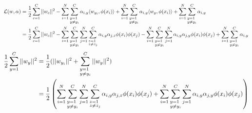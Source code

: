 \begin{align}
	\mathcal{L}(w,\alpha) &= 
	\frac{1}{2} \sum_{c=1}^C ||w_c||^2 
	 - \sum_{i=1}^N \sum_{\begin{subarray}{l} y=1 \\ y\neq y_i \end{subarray}}^C 
	   \alpha_{i,y} \langle w_{y_i}, \phi(x_i)\rangle 
	 + \sum_{i=1}^N \sum_{\begin{subarray}{l} y=1 \\ y\neq y_i \end{subarray}}^C 
	   \alpha_{i,y} \langle w_y, \phi(x_i)\rangle 
	 + \sum_{i=1}^N \sum_{\begin{subarray}{l} y=1 \\ y\neq y_i \end{subarray}}^C 
	 	\alpha_{i,y} \\
	&=  \frac{1}{2} \sum_{c=1}^C ||w_c||^2 
	 - \sum_{i=1}^N \sum_{\begin{subarray}{l} y=1 \\ y\neq y_i \end{subarray}}^C 
		\sum_{j=1}^N \sum_{\begin{subarray}{l} z=1 \\ z\neq z_j \end{subarray}}^C 
	   \alpha_{i,y} \alpha_{j,z} \phi(x_i) \phi(x_j) 
	 - \sum_{i=1}^N \sum_{\begin{subarray}{l} y=1 \\ y\neq y_i \end{subarray}}^C 
	\sum_{j=1}^N 
	   \alpha_{i,y} \alpha_{j,y} \phi(x_i) \phi(x_j) 
	 + \sum_{i=1}^N \sum_{\begin{subarray}{l} y=1 \\ y\neq y_i \end{subarray}}^C 
	 	\alpha_{i,y}
\end{align}
\begin{align}
	\frac{1}{2} \sum_{y=1}^C ||w_y||^2 &= 
	\frac{1}{2}(||w_{y_i}||^2 + \sum_{\begin{subarray}{l} y=1 \\ y\neq y_i \end{subarray}}^C || w_y ||^2)\\
	&= \frac{1}{2}\left( \sum_{i=1}^N \sum_{\begin{subarray}{l} y=1 \\ y\neq y_i \end{subarray}}^C 
		\sum_{j=1}^N \sum_{\begin{subarray}{l} z=1 \\ z\neq z_j \end{subarray}}^C 
	   \alpha_{i,y} \alpha_{j,z} \phi(x_i) \phi(x_j) 
	 +\sum_{i=1}^N \sum_{\begin{subarray}{l} y=1 \\ y\neq y_i \end{subarray}}^C 
	\sum_{j=1}^N 
	   \alpha_{i,y} \alpha_{j,y} \phi(x_i) \phi(x_j) 
	  \right) 
\end{align}
